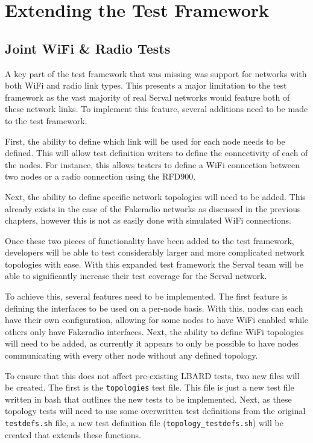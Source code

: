 
\chapter{Extending the Test Framework} %
\label{Chapter4}

\section{Joint WiFi \& Radio Tests}
A key part of the test framework that was missing was support for networks with both WiFi and radio link types. 
This presents a major limitation  to the test framework as the vast majority of real Serval networks would feature both of these network links.
To implement this feature, several additions need to be made to the test framework.

First, the ability to define which link will be used for each node needs to be defined.
This will allow test definition writers to define the connectivity of each of the nodes. 
For instance, this allows testers to define a WiFi connection between two nodes or a radio connection using the RFD900.

Next, the ability to define specific network topologies will need to be added.
This already exists in the case of the Fakeradio networks as discussed in the previous chapters, however this is not as easily done with simulated WiFi connections.

Once these two pieces of functionality have been added to the test framework, developers will be able to test considerably larger and more complicated network topologies with ease.
With this expanded test framework the Serval team will be able to significantly increase their test coverage for the Serval network.


To achieve this, several features need to be implemented. 
The first feature is defining the interfaces to be used on a per-node basis.
With this, nodes can each have their own configuration, allowing for some nodes to have WiFi enabled while others only have Fakeradio interfaces.
Next, the ability to define WiFi topologies will need to be added, as currently it appears to only be possible to have nodes communicating with every other node without any defined topology.

To ensure that this does not affect pre-existing LBARD tests, two new files will be created.
The first is the \verb|topologies| test file.
This file is just a new test file written in bash that outlines the new tests to be implemented.
Next, as these topology tests will need to use some overwritten test definitions from the original \texttt{testdefs.sh} file, a new test definition file (\texttt{topology\_testdefs.sh}) will be created that extends these functions.




